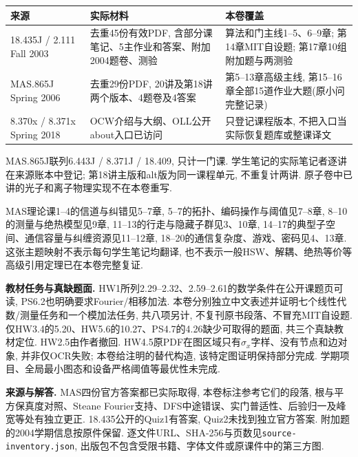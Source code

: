 \begin{longtable}{p{.23\linewidth}p{.27\linewidth}p{.40\linewidth}}
\toprule 来源 & 实际材料 & 本卷覆盖\\\midrule\endhead
18.435J / 2.111 Fall 2003 & 去重45份有效PDF, 含部分课笔记、5主作业和答案、附加2004题卷、测验 & 算法和门主线1--5、6--9章; 第14章MIT自设题; 第17章10组附加题与两测验\\
MAS.865J Spring 2006 & 去重29份PDF, 20讲及第18讲两个版本、4题卷及4答案 & 第5--13章高级主线, 第15--16章全部15道作业大题(原小问完整记录)\\
8.370x / 8.371x Spring 2018 & OCW介绍与大纲、OLL公开about入口已访问 & 只登记课程版本, 不把入口当实际恢复题库或整课译文\\\bottomrule
\end{longtable}
MAS.865J联列6.443J / 8.371J / 18.409, 只计一门课. 学生笔记的实际笔记者逐讲在来源账本中登记; 第18讲主版和alt版为同一课程单元, 不重复计两讲. 原子卷中已讲的光子和离子物理实现不在本卷重写.

MAS理论课1--4的信道与纠错见5--7章, 5--7的拓扑、编码操作与阈值见7--8章, 8--10的测量与绝热模型见9章, 11--13的行走与隐藏子群见3、10章, 14--17的典型子空间、通信容量与纠缠资源见11--12章, 18--20的通信复杂度、游戏、密码见4、13章. 这张主题映射不表示每句学生笔记均翻译, 也不表示一般HSW、解耦、绝热等价等高级引用定理已在本卷完整复证.

\textbf{教材任务与真缺题面.} HW1所列2.29--2.32、2.59--2.61的数学条件在公开课题页可读, PS6.2也明确要求Fourier/相移加法. 本卷分别独立中文表述并证明七个线性代数/测量任务和一个模加法任务, 共八项另计, 不复刊原书段落、不冒充MIT自设题. 仅HW3.4的5.20、HW5.6的10.27、PS4.7的4.26缺少可取得的题面, 共三个真缺教材定位. HW2.5由作者撤回. HW4.5原PDF在图区域只有$\sigma_x$字样、没有节点和边对象, 并非仅OCR失败; 本卷给注明的替代构造, 该特定图证明保持部分完成. 学期项目、全局最小图态和设备严格阈值等最优性未完成.





\textbf{来源与解答.} MAS四份官方答案都已实际取得, 本卷标注参考它们的段落, 根与平方保真度对照、Steane Fourier支持、DFS中途错误、实门普适性、后验归一及峰宽等处有独立更正. 18.435公开的Quiz1有答案, Quiz2未找到独立官方答案. 附加题的2004学期信息按原件保留. 逐文件URL、SHA-256与页数见\texttt{source-inventory.json}, 出版包不包含受限书籍、字体文件或原课件中的第三方图.

